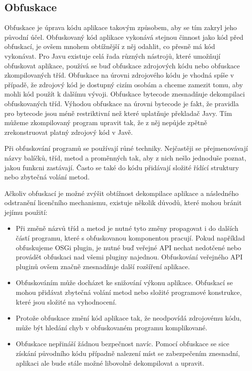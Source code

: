 \subsection{Obfuskace}

Obfuskace je úprava kódu aplikace takovým způsobem, aby se tím zakryl jeho
původní účel. Obfuskovaný kód aplikace vykonává stejnou činnost jako kód před
obfuskací, je ovšem mnohem obtížnější z něj odahlit, co přesně má kód vykonávat.
Pro Javu existuje celá řada různých nástrojů, které umožňují obfuskovat
aplikace, používá se buď obfuskace zdrojových kódu nebo obfuskace zkompilovaných
tříd. Obfuskace na úrovni zdrojového kódu je vhodná spíše v případě, že zdrojový
kód je dostupný cizím osobám a chceme zamezit tomu, aby mohli kód použít k
dalšímu vývoji. Obfuskace bytecode znesnadňuje dekompilaci obfuskovaných tříd.
Výhodou obfuskace na úrovni bytecode je fakt, že pravidla pro bytecode jsou méně
restriktivní než které uplatňuje překladač Javy. Tím můžeme zkompilovaný program
upravit tak, že z něj nepůjde zpětně zrekonstruovat platný zdrojový kód v Javě.

Při obfuskování programů se používají růné techniky. Nejčastěji se
přejmenovávají názvy balíčků, tříd, metod a proměnných tak, aby z nich nešlo
jednoduše poznat, jakou funkcni zastávají. Často se také do kódu přidávají
složité řídící struktury nebo zbytečná volání metod.

Ačkoliv obfuskací je možné zvýšit obtížnost dekompilace aplikace a následného
odstranění licenčního mechanismu, existuje několik důvodů, které mohou bránit
jejímu použití:

\begin{itemize}
  \item Při změně názvů tříd a metod je nutné tyto změny propagovat i do dalších
  částí programu, které s obfuskovanou komponentou pracují. Pokud například
  obfuskujeme \gls{OSGi} plugin, je nutné buď veřejné \gls{API} nechat nedotčené
  nebo provádět obfuskaci nad všemi pluginy najednou. Obfuskování veřejného
  \gls{API} pluginů ovšem značně znesnadňuje další rozšíření aplikace.
  \item Obfuskováním může docházet ke snižování výkonu aplikace. Obfuskací se
  mohou přidávat zbytečná volání metod nebo složité programové konstrukce, které
  jsou složité na vyhodnocení.
  \item Protože obfuskace změní kód aplikace tak, že neodpovídá zdrojovému kódu,
  může být hledání chyb v obfuskovaném programu komplikované.
  \item Obfuskace nepřináší žádnou bezpečnost navíc. Pomocí obfuskace se sice
  získání původního kódu případně nalezení míst se zabezpečením znesnadní,
  aplikaci ale bude stále možné libovolně dekompilovat a upravit.
\end{itemize}




